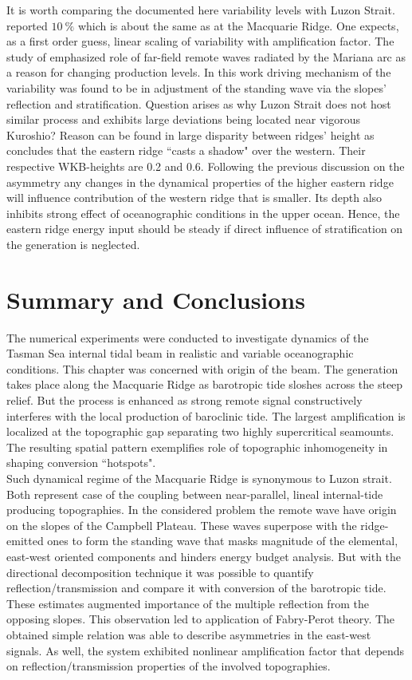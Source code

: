 \documentclass[12pt]{article}
\begin{document}
It is worth comparing the documented here variability levels with Luzon Strait. 
\cite{kerry2014impact} reported $10~\%$ which is about the same as at the Macquarie Ridge. One 
expects, as a first order 
guess, linear scaling of variability with amplification factor. The study of \cite{kerry2014impact} 
emphasized role of far-field remote waves radiated by the Mariana arc as a reason for 
changing production levels. In this work driving mechanism of the variability was found to be in 
adjustment of the standing wave via the slopes' reflection and stratification. Question arises as 
why Luzon Strait 
does not host similar process and exhibits large deviations being located near vigorous Kuroshio? 
Reason can be 
found in large 
disparity 
between ridges' height as \cite{klymak2013parameterizing} concludes that the eastern ridge ``casts 
a shadow" over the western. Their respective WKB-heights are 0.2 and 0.6. Following the previous 
discussion on the asymmetry any changes in the dynamical properties of the higher eastern ridge 
will influence contribution of the western ridge that is smaller. Its depth also 
inhibits strong effect of oceanographic conditions in the upper ocean. Hence, the eastern 
ridge energy input should be steady if direct influence of stratification on the generation is 
neglected.

\section{Summary and Conclusions}
The numerical experiments were conducted to investigate dynamics of the Tasman Sea internal tidal 
beam in realistic and variable oceanographic conditions. This chapter was concerned with origin of 
the beam. The generation takes place along the Macquarie Ridge as barotropic tide sloshes across 
the steep relief. But the process is enhanced as 
strong remote signal constructively interferes with the local production of baroclinic tide. The 
largest amplification is localized at the topographic gap separating two highly supercritical 
seamounts. The resulting spatial pattern exemplifies role of topographic inhomogeneity in shaping 
conversion ``hotspots".\\

Such dynamical regime of the Macquarie Ridge is synonymous to Luzon strait. Both represent case of 
the coupling between near-parallel, lineal internal-tide producing topographies. In the considered 
problem the 
remote wave have origin on the slopes of the Campbell Plateau. These waves superpose with the 
ridge-emitted ones to form the standing wave that masks magnitude of the elemental, east-west 
oriented components and hinders energy budget analysis. But with the directional decomposition 
technique it was possible to quantify reflection/transmission and compare it with conversion of 
the barotropic tide. These estimates augmented importance of the multiple reflection from the 
opposing slopes. This observation led to application of Fabry-Perot theory. The obtained simple 
relation was able to describe asymmetries in the east-west signals. As well, the system exhibited 
nonlinear amplification factor that depends on reflection/transmission properties of the involved 
topographies.\\
\end{document}
